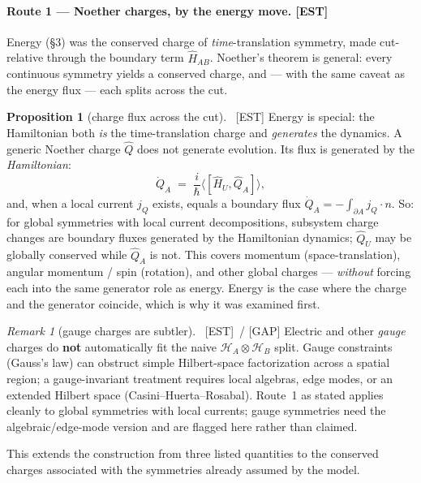 \documentclass[11pt]{article}
\newcommand{\est}{\textcolor{teal!70!black}{\textsf{\small[EST]}}}
\newcommand{\fields}{\textcolor{violet}{\textsf{\small[FIELDS]}}}
\newcommand{\asm}{\textcolor{blue!70!black}{\textsf{\small[ASM]}}}
\newcommand{\gap}{\textcolor{red!75!black}{\textsf{\small[GAP]}}}
\def\est{[EST]}\def\fields{[FIELDS]}\def\asm{[ASM]}%
\theoremstyle{definition}
\newtheorem{proposition}{Proposition}[section]
\theoremstyle{remark}
\newtheorem*{remark}{Remark}
\begin{document}
\paragraph{Route 1 --- Noether charges, by the energy move. \est}
Energy (\S3) was the conserved charge of \emph{time}-translation symmetry, made cut-relative through the boundary term $\hat{H}_{AB}$. Noether's theorem is general: every continuous symmetry yields a conserved charge, and — with the same caveat as the energy flux — each splits across the cut.

\begin{proposition}[charge flux across the cut]{\normalfont\ \est}
Energy is special: the Hamiltonian both \emph{is} the time-translation charge and \emph{generates} the dynamics. A generic Noether charge $\hat{Q}$ does not generate evolution. Its flux is generated by the \emph{Hamiltonian}:
\[
  \dot{Q}_A \;=\; \frac{i}{\hbar}\big\langle [\hat{H}_U, \hat{Q}_A]\big\rangle,
\]
and, when a local current $j_Q$ exists, equals a boundary flux $\dot{Q}_A = -\int_{\partial A} j_Q\!\cdot n$. So: for global symmetries with local current decompositions, subsystem charge changes are boundary fluxes generated by the Hamiltonian dynamics; $\hat{Q}_U$ may be globally conserved while $\hat{Q}_A$ is not. This covers momentum (space-translation), angular momentum / spin (rotation), and other global charges --- \emph{without} forcing each into the same generator role as energy. Energy is the case where the charge and the generator coincide, which is why it was examined first.
\end{proposition}

\begin{remark}[gauge charges are subtler]{\normalfont\ \est\ / \gap}
Electric and other \emph{gauge} charges do \textbf{not} automatically fit the naive $\mathcal{H}_A\otimes\mathcal{H}_B$ split. Gauge constraints (Gauss's law) can obstruct simple Hilbert-space factorization across a spatial region; a gauge-invariant treatment requires local algebras, edge modes, or an extended Hilbert space (Casini--Huerta--Rosabal). Route~1 as stated applies cleanly to global symmetries with local currents; gauge symmetries need the algebraic/edge-mode version and are flagged here rather than claimed.
\end{remark}

\noindent This extends the construction from three listed quantities to the conserved charges associated with the symmetries already assumed by the model.
\end{document}
